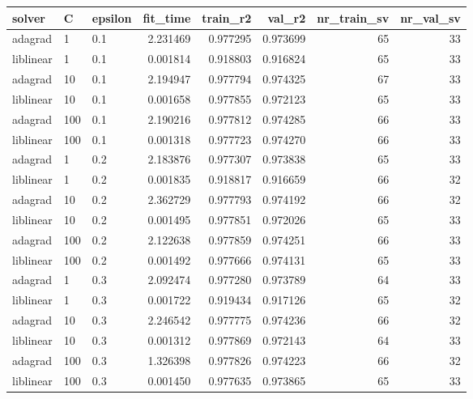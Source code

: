 \begin{tabular}{lllrrrrr}
\toprule
   solver &   C & epsilon &  fit\_time &  train\_r2 &   val\_r2 &  nr\_train\_sv &  nr\_val\_sv \\
\midrule
  adagrad &   1 &     0.1 &  2.231469 &  0.977295 & 0.973699 &           65 &         33 \\
liblinear &   1 &     0.1 &  0.001814 &  0.918803 & 0.916824 &           65 &         33 \\
  adagrad &  10 &     0.1 &  2.194947 &  0.977794 & 0.974325 &           67 &         33 \\
liblinear &  10 &     0.1 &  0.001658 &  0.977855 & 0.972123 &           65 &         33 \\
  adagrad & 100 &     0.1 &  2.190216 &  0.977812 & 0.974285 &           66 &         33 \\
liblinear & 100 &     0.1 &  0.001318 &  0.977723 & 0.974270 &           66 &         33 \\
  adagrad &   1 &     0.2 &  2.183876 &  0.977307 & 0.973838 &           65 &         33 \\
liblinear &   1 &     0.2 &  0.001835 &  0.918817 & 0.916659 &           66 &         32 \\
  adagrad &  10 &     0.2 &  2.362729 &  0.977793 & 0.974192 &           66 &         32 \\
liblinear &  10 &     0.2 &  0.001495 &  0.977851 & 0.972026 &           65 &         33 \\
  adagrad & 100 &     0.2 &  2.122638 &  0.977859 & 0.974251 &           66 &         33 \\
liblinear & 100 &     0.2 &  0.001492 &  0.977666 & 0.974131 &           65 &         33 \\
  adagrad &   1 &     0.3 &  2.092474 &  0.977280 & 0.973789 &           64 &         33 \\
liblinear &   1 &     0.3 &  0.001722 &  0.919434 & 0.917126 &           65 &         32 \\
  adagrad &  10 &     0.3 &  2.246542 &  0.977775 & 0.974236 &           66 &         32 \\
liblinear &  10 &     0.3 &  0.001312 &  0.977869 & 0.972143 &           64 &         33 \\
  adagrad & 100 &     0.3 &  1.326398 &  0.977826 & 0.974223 &           66 &         32 \\
liblinear & 100 &     0.3 &  0.001450 &  0.977635 & 0.973865 &           65 &         33 \\
\bottomrule
\end{tabular}

